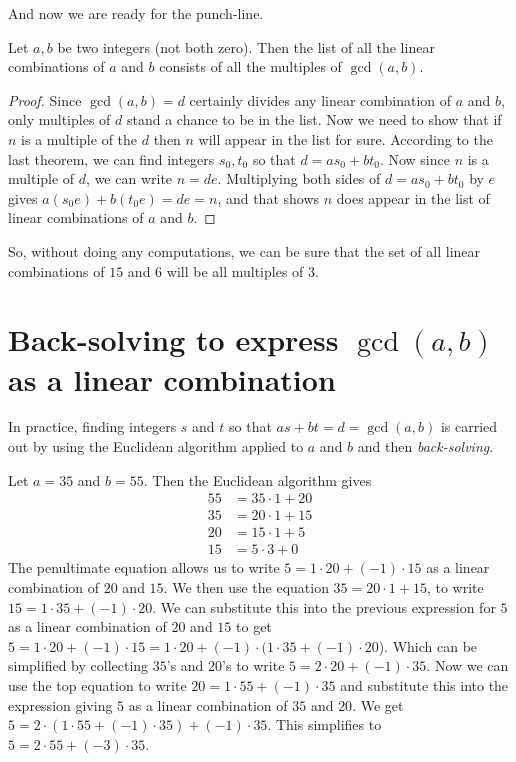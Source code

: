 And now we are ready for the punch-line.

\begin{thm}
Let $a,b$ be two integers (not both zero). Then the list of all the linear
combinations of $a$ and $b$ consists of all the multiples of $\gcd(a,b)$.
\end{thm}
\begin{proof}Since  $\gcd(a,b)=d$  certainly divides any linear combination of $a$ and $b$, only
multiples of $d$ stand a 
chance to be in the list. Now we need to show that if $n$ is a multiple of the $d$ then $n$ will
appear in the list for sure. According to the last theorem, we can find integers
$s_0,t_0$ so that $d=as_0+bt_0$. Now since $n$ is a multiple of $d$,
we can write $n = de$. Multiplying both sides of $d=as_0+bt_0$ by
$e$ gives $a(s_0e) + b(t_0e) = de = n$, and that shows $n$ does appear
in the list of linear combinations of $a$ and $b$.
\end{proof}

So, without doing any computations, we can be sure that the
set of all linear combinations of $15$ and $6$ will be all multiples
of $3$. 

\section{Back-solving to express $\gcd(a,b)$ as a linear combination}\label{sect:gcd back-solving}
In practice, finding integers $s$ and $t$ so that $as+bt=d=\gcd(a,b)$ is
carried out by using the Euclidean algorithm applied to $a$ and $b$ and
then {\itshape back-solving}.

\begin{exmp}\label{exmp:gcd(55,35) backward}
Let $a=35$ and $b=55$. Then the Euclidean algorithm gives
\begin{align*}
 55&=35\cdot 1+20 \\
 35&=20\cdot 1+15 \\ 
 20&=15\cdot 1 + 5 \\ 
 15&=5\cdot 3+0
\end{align*}
The penultimate equation allows us to write $5=1\cdot 20 +(-1)\cdot 15$ as a linear combination
of $20$ and $15$. We then use the equation $35=20\cdot 1 + 15$, to write $15=1\cdot 35+(-1)\cdot 20$.
We can substitute this into the previous expression for $5$ as a linear combination of $20$ and $15$
to get $5=1\cdot 20 +(-1)\cdot 15=1\cdot 20 +(-1)\cdot (1\cdot 35 + (-1)\cdot 20$). Which can be simplified
by collecting $35$'s and $20$'s to write $5=2\cdot 20+(-1)\cdot 35$. Now we can use the
top equation to write $20=1\cdot 55+(-1)\cdot 35$ and substitute this into the expression
giving $5$ as a linear combination of $35$ and $20$. We get $5=2\cdot (1\cdot 55+(-1)\cdot 35)+(-1)\cdot 35$.
This simplifies to $5=2\cdot 55+(-3)\cdot 35$.
\end{exmp}

